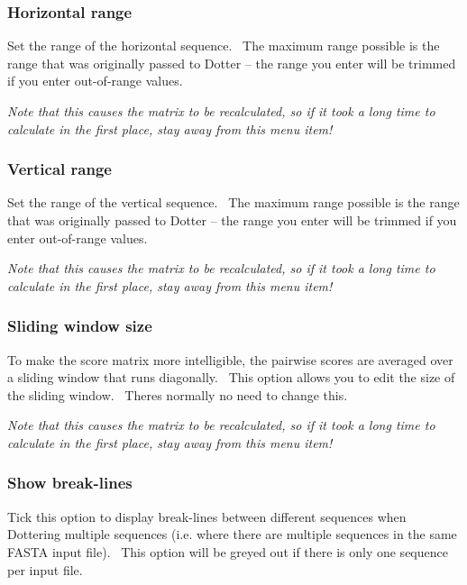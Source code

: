 \documentclass[letterpaper]{article}
\begin{document}
\bigskip

{\color[rgb]{0.30980393,0.5058824,0.7411765}\subsubsection[Horizontal range]{Horizontal range}}
{Set the range of the horizontal sequence. \ The maximum range possible
is the range that was originally passed to Dotter -- the range you
enter will be trimmed if you enter out-of-range values.}

\bigskip

{\itshape
Note that this causes the matrix to be recalculated, so if it took a
long time to calculate in the first place, stay away from this menu
item!}

\bigskip

{\color[rgb]{0.30980393,0.5058824,0.7411765}\subsubsection[Vertical range]{Vertical range}}
{Set the range of the vertical sequence. \ The maximum range possible is
the range that was originally passed to Dotter -- the range you enter
will be trimmed if you enter out-of-range values.}

\bigskip

{\itshape
Note that this causes the matrix to be recalculated, so if it took a
long time to calculate in the first place, stay away from this menu
item!}

\bigskip

{\color[rgb]{0.30980393,0.5058824,0.7411765}\subsubsection[Sliding window size]{Sliding window size}}
{To make the score matrix more intelligible, the pairwise scores are
averaged over a sliding window that runs diagonally. \ This option
allows you to edit the size of the sliding window.
\ There{\textquotesingle}s normally no need to change this.}

\bigskip

{\itshape
Note that this causes the matrix to be recalculated, so if it took a
long time to calculate in the first place, stay away from this menu
item!}

\bigskip

{\color[rgb]{0.30980393,0.5058824,0.7411765}\subsubsection[Show break{}-lines]{Show break-lines}}
{Tick this option to display break-lines between different sequences when
Dottering multiple sequences (i.e. where there are multiple sequences
in the same FASTA input file). \ This option will be greyed out if
there is only one sequence per input file.}
\end{document}
